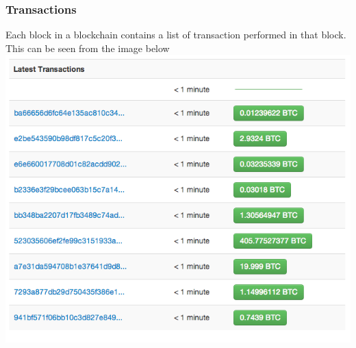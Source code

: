 \documentclass{report}
\begin{document}
 \subsubsection{Transactions}
Each block in a blockchain contains a list of transaction performed in that block. This can be seen from the image below
\\
 \includegraphics[scale=0.25]{blockchain-transactions.png}
\end{document}
